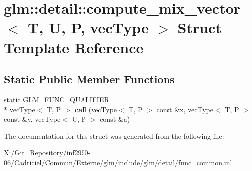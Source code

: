 \hypertarget{structglm_1_1detail_1_1compute__mix__vector}{\section{glm\-:\-:detail\-:\-:compute\-\_\-mix\-\_\-vector$<$ T, U, P, vec\-Type $>$ Struct Template Reference}
\label{structglm_1_1detail_1_1compute__mix__vector}
}
\subsection*{Static Public Member Functions}
\begin{DoxyCompactItemize}
\item 
\hypertarget{structglm_1_1detail_1_1compute__mix__vector_a68153ea8943ca1ffac025040a197c590}{static G\-L\-M\-\_\-\-F\-U\-N\-C\-\_\-\-Q\-U\-A\-L\-I\-F\-I\-E\-R \\*
vec\-Type$<$ T, P $>$ {\bfseries call} (vec\-Type$<$ T, P $>$ const \&x, vec\-Type$<$ T, P $>$ const \&y, vec\-Type$<$ U, P $>$ const \&a)}\label{structglm_1_1detail_1_1compute__mix__vector_a68153ea8943ca1ffac025040a197c590}

\end{DoxyCompactItemize}


The documentation for this struct was generated from the following file\-:\begin{DoxyCompactItemize}
\item 
X\-:/\-Git\-\_\-\-Repository/inf2990-\/06/\-Cadriciel/\-Commun/\-Externe/glm/include/glm/detail/func\-\_\-common.\-inl\end{DoxyCompactItemize}
